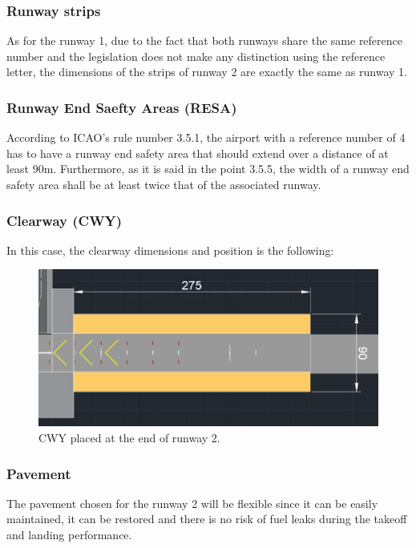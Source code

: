 	
		\subsubsection{Runway strips}
		As for the runway 1, due to the fact that both runways share the same reference number and the legislation does not make any distinction using the reference letter, the dimensions of the strips of runway 2 are exactly the same as runway 1. 
		
		\subsubsection{Runway End Saefty Areas (RESA)}
		According to ICAO's rule number 3.5.1, the airport with a 	reference number of 4 has to have a runway end safety area that should extend over a distance of at least 90m. Furthermore, as it is said in the point 3.5.5, the width of a runway end safety area shall be at least twice that of the associated runway. 
	
		\subsubsection{Clearway (CWY)}
		In this case, the clearway dimensions and position is the following:
	
		\begin{figure}[H]
			\centering
			\includegraphics[clip, trim=0cm 0cm 0cm 0cm, width=1\textwidth]{./images/declareddistances/CWY2}
			\caption{CWY placed at the end of runway 2.} %
			\label{} %
		\end{figure}
		
		\subsubsection{Pavement}
		The pavement chosen for the runway 2 will be flexible since it can be easily maintained, it can be restored and there is no risk of fuel leaks during the takeoff and landing performance.

